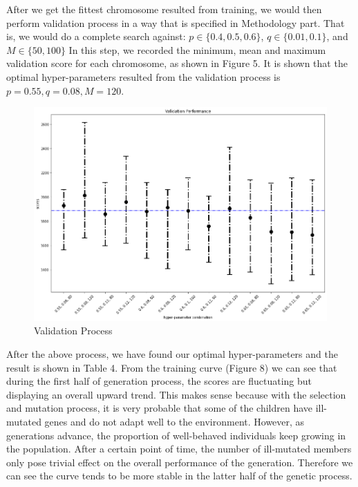\documentclass[letterpaper]{article} %
\begin{document}
\begin{itemize}
  After we get the fittest chromosome resulted from training, we would then perform validation process in a way that is specified in Methodology part. That is, we would do a complete search against:
    $p\in\{0.4,0.5,0.6\}$, 
    $q \in \{0.01, 0.1\}$, and
    $M \in \{50, 100\}$
  In this step, we recorded the minimum, mean and maximum validation score for each chromosome, as shown in Figure 5. It is shown that the optimal hyper-parameters resulted from the validation process is ${p = 0.55, q = 0.08, M = 120}$.
  \begin{figure}[h!]
    \centering
    \includegraphics[width=0.9\linewidth]{figures/GA2}
    \caption{Validation Process}
    \label{fig:ga2}
  \end{figure}
  
  After the above process, we have found our optimal hyper-parameters and the result is shown in Table 4. From the training curve (Figure 8) we can see that during the first half of generation process, the scores are fluctuating but displaying an overall upward trend. This makes sense because with the selection and mutation process, it is very probable that some of the children have ill-mutated genes and do not adapt well to the environment. However, as generations advance, the proportion of well-behaved individuals keep growing in the population. After a certain point of time, the number of ill-mutated members only pose trivial effect on the overall performance of the generation. Therefore we can see the curve tends to be more stable in the latter half of the genetic process. 
  

\end{itemize}
\end{document}

